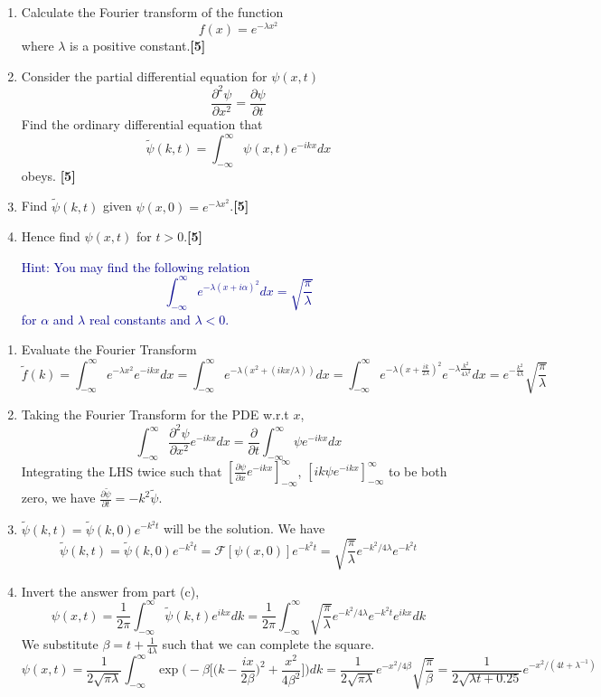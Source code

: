 \documentclass[a4paper]{article}
\begin{document}
\newpage
\begin{qns}\leavevmode
\begin{enumerate}[label=(\alph*)]
\item Calculate the Fourier transform of the function
$$f(x)=e^{-\lambda x^2}$$
where $\lambda$ is a positive constant.\hfill \textbf{[5]}
\item Consider the partial differential equation for $\psi(x,t)$
$$\frac{\partial^2\psi}{\partial x^2}=\frac{\partial\psi}{\partial t}$$
Find the ordinary differential equation that
$$\tilde{\psi}(k,t)=\int_{-\infty}^\infty\psi(x,t)e^{-ikx}dx$$
obeys. \hfill \textbf{[5]}
\item Find $\tilde{\psi}(k,t)$ given $\psi(x,0)=e^{-\lambda x^2}$.\hfill \textbf{[5]}
\item Hence find $\psi(x,t)$ for $t>0$.\hfill \textbf{[5]}
\begin{mdframed}
\textcolor{darkblue}{Hint: You may find the following relation 
$$\int_{-\infty}^\infty e^{-\lambda(x+i\alpha)^2}dx=\sqrt{\frac{\pi}{\lambda}}$$
for $\alpha$ and $\lambda$ real constants and $\lambda<0$.}
\end{mdframed}
\end{enumerate}
\end{qns}
\begin{ans}\begin{enumerate}[label=(\alph*)]
\item Evaluate the Fourier Transform
$$\tilde{f}(k)=\int_{-\infty}^\infty e^{-\lambda x^2}e^{-ikx}dx=\int_{-\infty}^\infty e^{-\lambda(x^2+(ikx/\lambda))}dx=\int_{-\infty}^\infty e^{-\lambda(x+\frac{ik}{2\lambda})^2}e^{-\lambda\frac{k^2}{4\lambda^2}}dx=e^{-\frac{k^2}{4\lambda}}\sqrt{\frac{\pi}{\lambda}}$$
\item Taking the Fourier Transform for the PDE w.r.t $x$,
$$\int_{-\infty}^\infty\frac{\partial^2\psi}{\partial x^2}e^{-ikx}dx=\frac{\partial}{\partial t}\int_{-\infty}^\infty\psi e^{-ikx}dx$$
Integrating the LHS twice such that $[\frac{\partial\psi}{\partial x}e^{-ikx}]_{-\infty}^\infty$, $[ik\psi e^{-ikx}]_{-\infty}^\infty$ to be both zero, we have $\frac{\partial\tilde{\psi}}{\partial t}=-k^2\tilde{\psi}$.
\item $\tilde{\psi}(k,t)=\tilde{\psi}(k,0)e^{-k^2t}$ will be the solution. We have
$$\tilde{\psi}(k,t)=\tilde{\psi}(k,0)e^{-k^2t}=\mathcal{F}[\psi(x,0)]e^{-k^2t}=\sqrt{\frac{\pi}{\lambda}}e^{-k^2/4\lambda}e^{-k^2t}$$
\item Invert the answer from part (c),
$$\psi(x,t)=\frac{1}{2\pi}\int_{-\infty}^\infty\tilde{\psi}(k,t)e^{ikx}dk=\frac{1}{2\pi}\int_{-\infty}^\infty\sqrt{\frac{\pi}{\lambda}}e^{-k^2/4\lambda}e^{-k^2t}e^{ikx}dk$$
We substitute $\beta=t+\frac{1}{4\lambda}$ such that we can complete the square.
$$\psi(x,t)=\frac{1}{2\sqrt{\pi\lambda}}\int_{-\infty}^{\infty}\exp\bigg(-\beta\bigg[\bigg(k-\frac{ix}{2\beta}\bigg)^2+\frac{x^2}{4\beta^2}\bigg]\bigg)dk=\frac{1}{2\sqrt{\pi\lambda}}e^{-x^2/4\beta}\sqrt{\frac{\pi}{\beta}}=\frac{1}{2\sqrt{\lambda t+0.25}}e^{-x^2/(4t+\lambda^{-1})}$$
\end{enumerate}
\end{ans}
\end{document}
